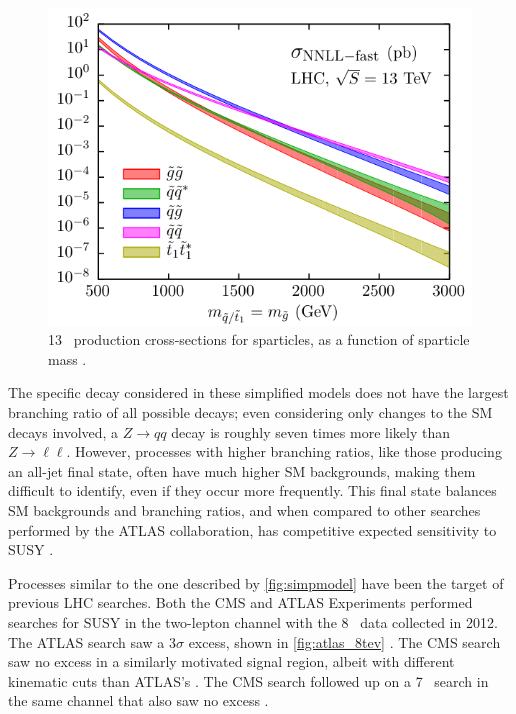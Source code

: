 \begin{centering}
\begin{figure}[!hbt]
\myfloatalign
\includegraphics[width=.9\linewidth]{figures/theory/nnllfast_wpresc_total.pdf}
\caption{ 13 \tev~production cross-sections for sparticles, as a function of sparticle mass \cite{1607.07741}.}
\label{fig:gluino_xs}
\end{figure}
\end{centering}

The specific decay considered in these simplified models does not have the largest branching ratio of all possible decays; even considering only changes to the \ac{SM} decays involved, a $Z\rightarrow qq$ decay is roughly seven times more likely than $Z\rightarrow\ell\ell$. However, processes with higher branching ratios, like those producing an all-jet final state, often have much higher \ac{SM} backgrounds, making them difficult to identify, even if they occur more frequently. This final state balances \ac{SM} backgrounds and branching ratios, and when compared to other searches performed by the \ac{ATLAS} collaboration, has competitive expected sensitivity to \ac{SUSY} \cite{summary_plot}. 

Processes similar to the one described by \autoref{fig:simpmodel} have been the target of previous \ac{LHC} searches. Both the \ac{CMS} and \ac{ATLAS} Experiments performed searches for \ac{SUSY} in the two-lepton channel with the 8 \tev~data collected in 2012. The \ac{ATLAS} search saw a 3$\sigma$ excess, shown in \autoref{fig:atlas_8tev} \cite{SUSY-2014-10}. The \ac{CMS} search saw no excess in a similarly motivated signal region, albeit with different kinematic cuts than \ac{ATLAS}'s \cite{Chatrchyan:2012qka}. The \ac{CMS} search followed up on a 7 \tev~search in the same channel that also saw no excess \cite{CMS2}. 

